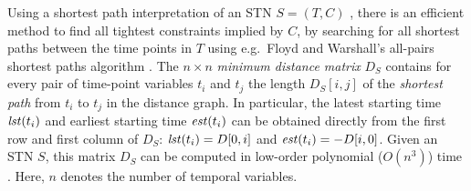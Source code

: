 Using a shortest path interpretation of an STN $S=(T,C)$ \cite{dechter:2003}, there is an efficient method to find all tightest constraints implied by $C$, by searching for all shortest paths between the time points in $T$ using e.g.\ Floyd and Warshall's all-pairs shortest paths algorithm \cite{floyd:1962}. The $n\times n$ \emph{minimum distance matrix} $D_S$ contains for every pair of time-point variables $t_i$ and $t_j$ the length $D_S[i,j]$ of the \emph{shortest path} from $t_i$ to $t_j$ in the distance graph. In  particular, 
the latest starting time $\mathit{lst}(t_i)$ and earliest starting time $\mathit{est}(t_i)$ can be obtained directly from the first row and first column of $D_S$: $\mathit{lst}(t_i) = D[0,i]$ and $\mathit{est}(t_i) = -D[i,0]$.
Given an STN $S$, this matrix $D_S$ can be computed in low-order polynomial ($O(n^3)$) time  \cite{dechter:2003}. Here, $n$ denotes the number of temporal variables.

